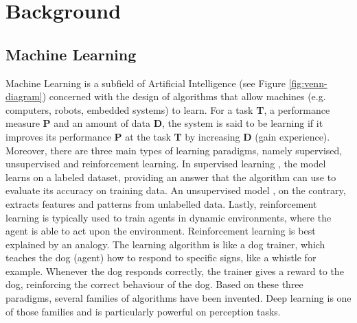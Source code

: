 \chapter{Background} 
\label{chapter-background} 


\section{Machine Learning}
Machine Learning is a subfield of Artificial Intelligence (see Figure \ref{fig:venn-diagram}) concerned with the design of algorithms that allow machines (e.g. computers, robots, embedded systems) to learn. For a task \textbf{T}, a performance measure \textbf{P} and an amount of data \textbf{D}, the system is said to be learning if it improves its performance \textbf{P} at the task \textbf{T} by increasing \textbf{D} (gain experience). Moreover, there are three main types of learning paradigms, namely supervised, unsupervised and reinforcement learning. In supervised learning \citep{supervised}, the model learns on a labeled dataset, providing an answer that the algorithm can use to evaluate its accuracy on training data. An unsupervised model \citep{unsupervised}, on the contrary, extracts features and patterns from unlabelled data. Lastly, reinforcement learning \citep{sutton} is typically used to train agents in dynamic environments, where the agent is able to act upon the environment. Reinforcement learning is best explained by an analogy. The learning algorithm is like a dog trainer, which teaches the dog (agent) how to respond to specific signs, like a whistle for example. Whenever the dog responds correctly, the trainer gives a reward to the dog, reinforcing the correct behaviour of the dog. Based on these three paradigms, several families of algorithms have been invented. Deep learning \citep{deeplearning-overview} is one of those families and is particularly powerful on perception tasks.
